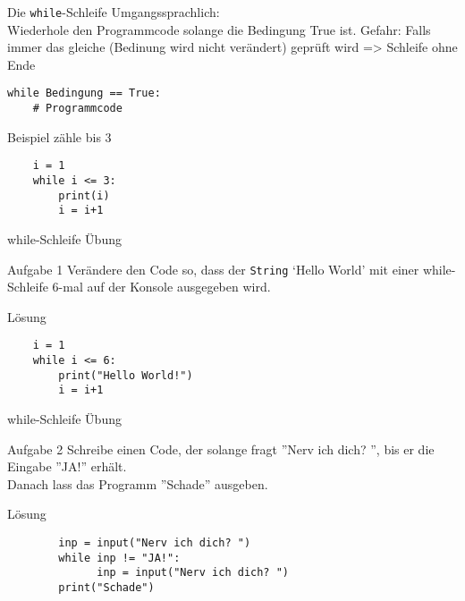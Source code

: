 \begin{frame}[fragile]{Die \texttt{while}-Schleife}
	Umgangssprachlich:\\
	Wiederhole den Programmcode solange die Bedingung True ist.
	Gefahr: Falls immer das gleiche (Bedinung wird nicht verändert) geprüft wird => Schleife ohne Ende

    \begin{lstlisting}
while Bedingung == True:
    # Programmcode

    \end{lstlisting}
    
    Beispiel zähle bis 3
    \begin{lstlisting}
    i = 1
    while i <= 3:
    	print(i)
    	i = i+1   
    \end{lstlisting}
   
\end{frame}

\begin{frame}[fragile]{while-Schleife Übung}
\begin{block}{Aufgabe 1}
	Verändere den Code so, dass der \texttt{String} `Hello World' mit einer while-Schleife 6-mal auf der Konsole ausgegeben wird.
\end{block}
\pause{}
\begin{exampleblock}{Lösung}
	\begin{lstlisting}		 
	i = 1
	while i <= 6:
		print("Hello World!")
		i = i+1   		
	\end{lstlisting}
\end{exampleblock}
\end{frame}

\begin{frame}[fragile]{while-Schleife Übung}
\begin{block}{Aufgabe 2}
	Schreibe einen Code, der solange fragt ''Nerv ich dich? '', bis er die Eingabe ''JA!'' erhält.\\
	Danach lass das Programm ''Schade'' ausgeben.
	
\end{block}
\pause{}
\begin{exampleblock}{Lösung}
	\begin{lstlisting}		 
		inp = input("Nerv ich dich? ")
		while inp != "JA!":
			  inp = input("Nerv ich dich? ")
		print("Schade")	
	\end{lstlisting}
\end{exampleblock}
\end{frame}



